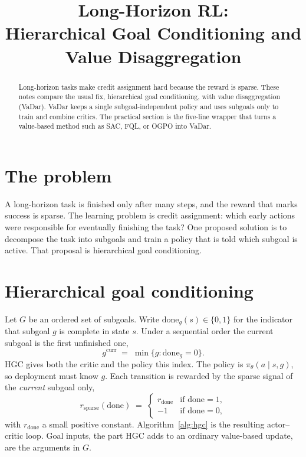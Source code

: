 \documentclass[11pt]{article}
\title{Long-Horizon RL:\\
Hierarchical Goal Conditioning and Value Disaggregation}
\author{}
\date{}
\begin{document}
\maketitle
\thispagestyle{empty}

\begin{abstract}
\noindent
Long-horizon tasks make credit assignment hard because the reward is sparse.
These notes compare the usual fix, hierarchical goal conditioning, with value disaggregation (VaDar).
VaDar keeps a single subgoal-independent policy and uses subgoals only to train and combine critics.
The practical section is the five-line wrapper that turns a value-based method such as SAC, FQL, or OGPO into VaDar.
\end{abstract}

\section{The problem}
A long-horizon task is finished only after many steps, and the reward that marks success is sparse.
The learning problem is credit assignment: which early actions were responsible for eventually finishing the task?
One proposed solution is to decompose the task into subgoals and train a policy that is told which subgoal is active.
That proposal is hierarchical goal conditioning.

\section{Hierarchical goal conditioning}
Let $G$ be an ordered set of subgoals. Write $\mathrm{done}_g(s)\in\{0,1\}$ for the indicator that subgoal $g$ is complete in state $s$.
Under a sequential order the current subgoal is the first unfinished one,
\[
  g^{\mathrm{curr}} \;=\; \min\{g : \mathrm{done}_g = 0\}.
\]
HGC gives both the critic and the policy this index. The policy is $\pi_\theta(a\mid s,g)$, so deployment must know $g$.
Each transition is rewarded by the sparse signal of the \emph{current} subgoal only,
\[
  r_{\mathrm{sparse}}(\mathrm{done})
  \;=\;
  \begin{cases}
    r_{\mathrm{done}} & \text{if }\mathrm{done}=1,\\
    -1 & \text{if }\mathrm{done}=0,
  \end{cases}
\]
with $r_{\mathrm{done}}$ a small positive constant. Algorithm~\ref{alg:hgc} is the resulting actor--critic loop.
Goal inputs, the part HGC adds to an ordinary value-based update, are the arguments in $G$.
\end{document}
